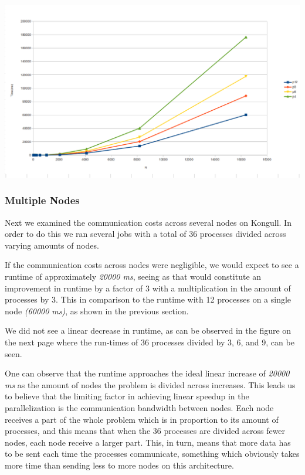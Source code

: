 \documentclass[fontsize=11pt,paper=a4,titlepage]{article}
\begin{document}
\hspace*{-1.7cm}\includegraphics[scale=0.6]{pics/pX.png}

\subsubsection{Multiple Nodes}

Next we examined the communication costs across several nodes on Kongull. In
order to do this we ran several jobs with a total of 36 processes divided across
varying amounts of nodes.

If the communication costs across nodes were negligible, we would expect to see
a runtime of approximately \emph{20000 ms}, seeing as that would constitute an
improvement in runtime by a factor of 3 with a multiplication in the amount of
processes by 3. This in comparison to the runtime with 12 processes on a single
node \emph{(60000 ms)}, as shown in the previous section.

We did not see a linear decrease in runtime, as can be observed in the figure
on the next page where the run-times of 36 processes divided by 3, 6, and 9, can
be seen.

One can observe that the runtime approaches the ideal linear increase of
\emph{20000 ms} as the amount of nodes the problem is divided across increases.
This leads us to believe that the limiting factor in achieving linear speedup in
the parallelization is the communication bandwidth between nodes. Each node
receives a part of the whole problem which is in proportion to its amount of
processes, and this means that when the 36 processes are divided across fewer
nodes, each node receive a larger part. This, in turn, means that more data has
to be sent each time the processes communicate, something which obviously takes
more time than sending less to more nodes on this architecture.
\end{document}

